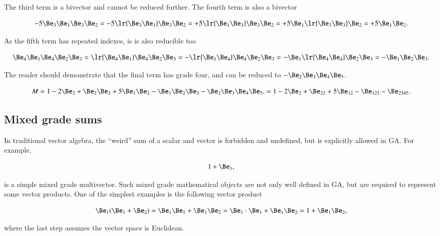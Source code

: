 The third term is a bivector and cannot be reduced further.  The fourth term is also a bivector

\begin{dmath}\label{eqn:SimpleProducts:80}
- 5 \Be_3 \Be_1 \Be_3 \Be_2
=
- 5 \lr{ \Be_3 \Be_1 } \Be_3 \Be_2
=
+ 5 \lr{ \Be_1 \Be_3 } \Be_3 \Be_2
=
+ 5 \Be_1 \lr{ \Be_3 \Be_3 } \Be_2
=
+ 5 \Be_1 \Be_2.
\end{dmath}

As the fifth term has repeated indexes, is is also reducible too

\begin{dmath}\label{eqn:SimpleProducts:100}
\Be_4 \Be_1 \Be_4 \Be_2 \Be_3
=
\lr{ \Be_4 \Be_1} \Be_4 \Be_2 \Be_3
=
-\lr{ \Be_1 \Be_4} \Be_4 \Be_2 \Be_3
=
- \Be_1 \lr{ \Be_4 \Be_4 } \Be_2 \Be_3
=
- \Be_1 \Be_2 \Be_3.
\end{dmath}

The reader should demonstrate that the final term has grade four, and can be reduced to \( -\Be_2 \Be_3 \Be_4 \Be_5 \).

\begin{dmath}\label{eqn:SimpleProducts:120}
M = 1 - 2 \Be_2  + \Be_2 \Be_3 + 5 \Be_1 \Be_2 - \Be_1 \Be_2 \Be_3 -\Be_2 \Be_3 \Be_4 \Be_5.
  = 1 - 2 \Be_2  + \Be_{23} + 5 \Be_{12} - \Be_{123} -\Be_{2345}.
\end{dmath}

\subsection{Mixed grade sums}
In traditional vector algebra, the
``weird'' sum of a scalar and vector is forbidden and undefined, but is explicitly allowed in GA.  For example,

\begin{dmath}\label{eqn:multivector:240}
1 + \Be_1,
\end{dmath}

is a simple mixed grade multivector.
Such mixed grade mathematical objects are not only well defined in GA, but are required to represent some vector products.  One of the simplest examples is the following vector product

\begin{dmath}\label{eqn:multivector:260}
\Be_1 ( \Be_1 + \Be_2 )
=
\Be_1 \Be_1 + \Be_1 \Be_2
=
\Be_1 \cdot \Be_1 + \Be_1 \Be_2
=
1 + \Be_1 \Be_2,
\end{dmath}

where the last step assumes the vector space is Euclidean.

